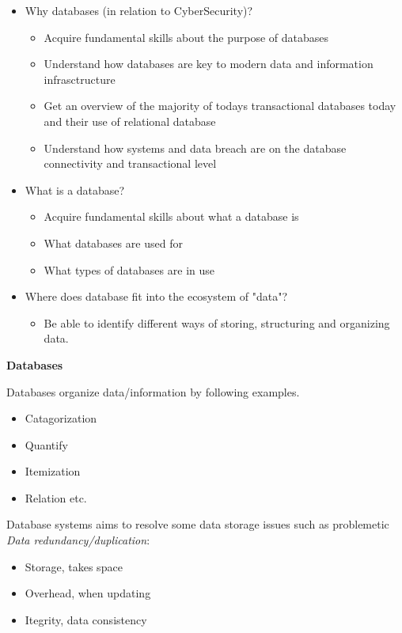{\begin{itemize}
    \item Why databases (in relation to CyberSecurity)?
        \begin{itemize}
            \item Acquire fundamental skills about the purpose of databases
            \item Understand how databases are key to modern data and information infrasctructure
            \item Get an overview of the majority of todays transactional databases today and their use of relational database
            \item Understand how systems and data breach are on the database connectivity and transactional level
        \end{itemize}
    \item What is a database?
        \begin{itemize}
            \item Acquire fundamental skills about what a database is
            \item What databases are used for
            \item What types of databases are in use
        \end{itemize}
    \item Where does database fit into the ecosystem of "data"?
        \begin{itemize}
            \item Be able to identify different ways of storing, structuring and organizing data.
        \end{itemize}
\end{itemize}


{\bfseries{Databases}}

Databases organize data/information by following examples.

\begin{itemize}
    \item Catagorization
    \item Quantify
    \item Itemization
    \item Relation etc.
\end{itemize}

Database systems aims to resolve some data storage issues such as problemetic {\emph{Data redundancy/duplication}}:
\begin{itemize}
    \item Storage, takes space
    \item Overhead, when updating
    \item Itegrity, data consistency
\end{itemize}

}
